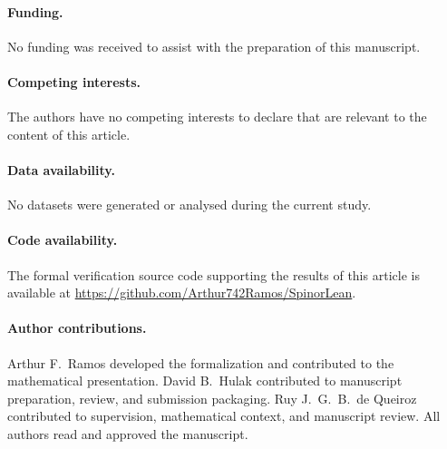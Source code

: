 \documentclass{birkjour}
\theoremstyle{plain}
\theoremstyle{definition}
\theoremstyle{remark}
\begin{document}
\paragraph{Funding.}
No funding was received to assist with the preparation of this manuscript.

\paragraph{Competing interests.}
The authors have no competing interests to declare that are relevant to the
content of this article.

\paragraph{Data availability.}
No datasets were generated or analysed during the current study.

\paragraph{Code availability.}
The formal verification source code supporting the results of this article is
available at \url{https://github.com/Arthur742Ramos/SpinorLean}.

\paragraph{Author contributions.}
Arthur F.~Ramos developed the formalization and contributed to the mathematical
presentation. David B.~Hulak contributed to manuscript preparation, review, and
submission packaging. Ruy J.~G.~B.~de Queiroz contributed to supervision,
mathematical context, and manuscript review. All authors read and approved the
manuscript.

\begingroup
\raggedright


\endgroup
\end{document}
